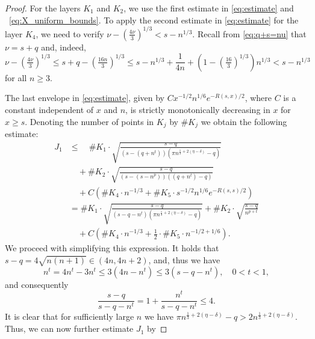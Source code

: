 \documentclass[11pt]{amsart}
\numberwithin{equation}{section}
\begin{document}
\begin{proof}
    For the layers $K_1$ and $K_2$, we use the first estimate in \eqref{eq:estimate} and ~\eqref{eq:X_uniform_bounds}.
    To apply the second estimate in \eqref{eq:estimate} for the layer $K_4$, we need to verify $\nu-(\tfrac{4\nu}{3})^{1/3}<s-n^{1/3}$. Recall from \eqref{eq:q+s=nu} that $\nu =s+q$ and, indeed,
      \begin{equation}
          \nu-(\tfrac{4\nu}{3})^{1/3} \leq s+q-(\tfrac{16n}{3})^{1/3} \leq s - n^{1/3} + \frac{1}{4n} +(1-(\tfrac{16}{3})^{1/3})n^{1/3}
          <s-n^{1/3}
        \end{equation}
    for all $n\geq 3$.
    
    The last envelope in \eqref{eq:estimate}, given by $C x^{-1/2} n^{1/6} e^{-R(s,x)/2}$, where $C$ is a constant independent of $x$ and $n$, is strictly monotonically decreasing in $x$ for $x \geq s$.
    Denoting the number of points in $K_j$ by $\# K_j$ we obtain the following estimate:
    \begin{equation}\label{eq:sum_K123}
        \begin{split}
            J_1
            & \leq \quad \#K_1\cdot \sqrt{\frac{s-q}{(s-(q+n^{t}))(\pi n^{\frac{1}{3}+2(\eta -\delta)}-q)}} \\
            & \quad + \#K_2 \cdot \sqrt{\frac{s-q}{(s-(s-n^{p}))((q+n^{t})-q)}}\\
            & \quad +C \left(\#K_4\cdot n^{-1/3} +\# K_5  \cdot s^{-1/2} n^{1/6} e^{-R(s,s)/2}\right) \\
            &= \#K_1 \cdot \sqrt{\frac{s-q}{(s-q-n^{t})(\pi n^{\frac{1}{3}+2(\eta -\delta)}-q)}} 
             + \#K_2 \cdot \sqrt{\frac{s-q}{n^{p+t}}} \\
            & \quad + C \left(\#K_4\cdot n^{-1/3} + \tfrac{1}{2} \cdot \# K_5 \cdot n^{-1/2+1/6}\right).
        \end{split}
    \end{equation}
    We proceed with simplifying this expression. It holds that $s-q = 4\sqrt{n(n+1)}\in (4n,4n+2)$, and, thus we have
    \begin{equation}
        n^{t}= 4n^{t}-3n^{t} \leq 3(4n-n^{t})
        \leq 3(s-q-n^{t}), 
        \quad 0 < t < 1,
    \end{equation}
    and consequently
    \begin{equation}
        \frac{s-q}{s-q-n^t} = 1+\frac{n^t}{s-q-n^t}\leq 4.
    \end{equation}
    It is clear that for sufficiently large $n$ we have $\pi n^{\frac{1}{3}+2(\eta -\delta)}-q>2n^{\frac{1}{3}+2(\eta -\delta)}$. Thus, we can now further estimate $J_1$ by

\end{proof}
\end{document}
